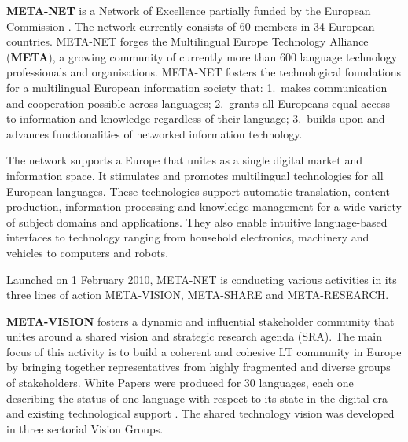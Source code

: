 \documentclass[10pt, plain]{../../metanetpaper}
\begin{document}

\begin{multicols}{2}
  \textbf{META-NET} is a Network of Excellence partially funded by the European Commission \cite{rehm2011}.  The network currently consists of 60 members in 34 European countries. META-NET forges the Multilingual Europe Technology Alliance (\textbf{META}), a growing community of currently more than 600 language technology professionals and organisations. META-NET fosters the technological foundations for a multilingual European information society that: 1.~makes communication and cooperation possible across languages; 2.~grants all Europeans equal access to information and knowledge regardless of their language; 3.~builds upon and advances functionalities of networked information technology.

The network supports a Europe that unites as a single digital market and information space. It stimulates and promotes multilingual technologies for all European languages. These technologies support automatic translation, content production, information processing and knowledge management for a wide variety of subject domains and applications. They also enable intuitive language-based interfaces to technology ranging from household electronics, machinery and vehicles to computers and robots.

Launched on 1 February 2010, META-NET is conducting various activities in its three lines of action META-VISION, META-SHARE and META-RESEARCH.

\textbf{META-VISION} fosters a dynamic and influential stakeholder community that unites around a shared vision and strategic research agenda (SRA). The main focus of this activity is to build a coherent and cohesive LT community in Europe by bringing together representatives from highly fragmented and diverse groups of stakeholders. White Papers were produced for 30 languages, each one describing the status of one language with respect to its state in the digital era and existing technological support \cite{LWP2012}. The shared technology vision was developed in three sectorial Vision Groups. 


\end{multicols}
\end{document}
